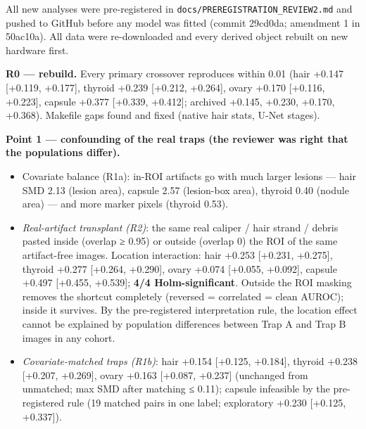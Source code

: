 {All new analyses were pre-registered in \texttt{docs/PREREGISTRATION\_REVIEW2.md} and pushed to GitHub before any model was
fitted (commit 29cd0da; amendment 1 in 50ac10a). All data were re-downloaded and every derived object rebuilt on new
hardware first.

\textbf{R0 --- rebuild.} Every primary crossover reproduces within 0.01 (hair +0.147 {[}+0.119, +0.177{]}, thyroid +0.239
{[}+0.212, +0.264{]}, ovary +0.170 {[}+0.116, +0.223{]}, capsule +0.377 {[}+0.339, +0.412{]}; archived +0.145, +0.230, +0.170,
+0.368). Makefile gaps found and fixed (native hair stats, U-Net stages).

\textbf{Point 1 --- confounding of the real traps (the reviewer was right that the populations differ).}

\begin{itemize}

\item
  Covariate balance (R1a): in-ROI artifacts go with much larger lesions --- hair SMD 2.13 (lesion area), capsule 2.57
  (lesion-box area), thyroid 0.40 (nodule area) --- and more marker pixels (thyroid 0.53).
\item
  \emph{Real-artifact transplant (R2)}: the same real caliper / hair strand / debris pasted inside (overlap ≥ 0.95) or
  outside (overlap 0) the ROI of the same artifact-free images. Location interaction: hair +0.253 {[}+0.231, +0.275{]},
  thyroid +0.277 {[}+0.264, +0.290{]}, ovary +0.074 {[}+0.055, +0.092{]}, capsule +0.497 {[}+0.455, +0.539{]}; \textbf{4/4
  Holm-significant}. Outside the ROI masking removes the shortcut completely (reversed = correlated = clean AUROC);
  inside it survives. By the pre-registered interpretation rule, the location effect cannot be explained by
  population differences between Trap A and Trap B images in any cohort.
\item
  \emph{Covariate-matched traps (R1b)}: hair +0.154 {[}+0.125, +0.184{]}, thyroid +0.238 {[}+0.207, +0.269{]}, ovary +0.163
  {[}+0.087, +0.237{]} (unchanged from unmatched; max \textbar SMD\textbar{} after matching ≤ 0.11); capsule infeasible by the pre-registered
  rule (19 matched pairs in one label; exploratory +0.230 {[}+0.125, +0.337{]}).
\end{itemize}

}
